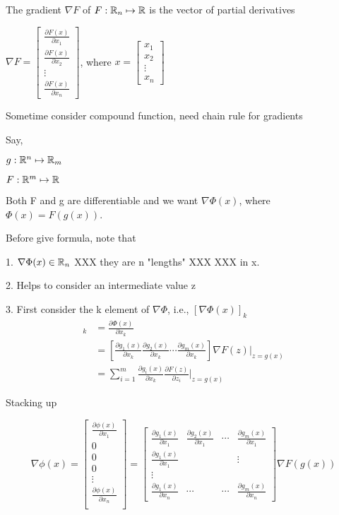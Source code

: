 The gradient $\nabla F$ of $F:\mathbb{R}_{n}\mapsto\mathbb{R}$ is the vector of partial derivatives

$\nabla F= 
\left[ 
\begin{array}{c} 
\frac{\partial F(x)}{\partial x_{1}} \\
\frac{\partial F(x)}{\partial x_{2}} \\
\vdots \\
\frac{\partial F(x)}{\partial x_{n}}
\end{array}
\right]$,
where $x= 
\left[ 
\begin{array}{c} 
x_{1} \\
x_{2} \\
\vdots \\
x_{n}
\end{array}
\right]$

Sometime consider compound function, need chain rule for gradients

Say,

$g:\mathbb{R}^{n}\mapsto\mathbb{R}_{m}$

$F:\mathbb{R}^{m}\mapsto\mathbb{R}$

Both F and g are differentiable and we want $\nabla\Phi (x)$, where $\Phi (x)=F(g(x))$.

Before give formula, note that

1. $\nabla\Phi (x) \in\mathbb{R}_{n}$ XXX they are n "lengths" XXX XXX in x.

2. Helps to consider an intermediate value z

3. First consider the k element of $\nabla\Phi$, i.e., $[\nabla\Phi(x)]_{k}$
\begin{align*}
[\nabla\Phi(x)]_{k}&=\frac{\partial\Phi (x)}{\partial x_{k}}\\
&=[\frac{\partial g_{1}(x)}{\partial x_{k}} \frac{\partial g_{2}(x)}{\partial x_{k}} \cdots \frac{\partial g_{m}(x)}{\partial x_{k}}] \nabla F(z)|_{z=g(x)}\\
&=\sum_{i=1}^{m} \frac{\partial g_{i}(x)}{\partial x_{k}} \frac{\partial F(z)}{\partial z_{i}}|_{z=g(x)}
\end{align*}

Stacking up 

$$
\nabla \phi (x)
=
\left[\begin{matrix}
	\frac{\partial \phi (x)}{\partial x_{1}}\\
	0\\
	0\\
	0\\
	\vdots\\
	\frac{\partial \phi (x)}{\partial x_{n}}\\
\end{matrix}\right]
=
\left[\begin{matrix}
	\frac{\partial g_{1}(x)}{\partial x_{1}}&\frac{\partial g_{2}(x)}{\partial x_{1}}&\cdots&\frac{\partial g_{m}(x)}{\partial x_{1}}\\
	\frac{\partial g_{1}(x)}{\partial x_{1}}& & &\vdots\\
	\vdots& & & \\
	\frac{\partial g_{1}(x)}{\partial x_{n}}&\cdots&\cdots&\frac{\partial g_{m}(x)}{\partial x_{n}}
\end{matrix}\right]
\nabla F(g(x))
$$

